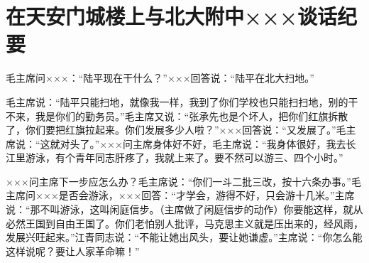 \section[在天安门城楼上与北大附中×××谈话纪要（一九六六年八月十八日）]{在天安门城楼上与北大附中×××谈话纪要}


毛主席问×××：“陆平现在干什么？”×××回答说：“陆平在北大扫地。”

毛主席说：“陆平只能扫地，就像我一样，我到了你们学校也只能扫扫地，别的干不来，我是你们的勤务员。”毛主席又说：“张承先也是个坏人，把你们红旗拆散了，你们要把红旗拉起来。你们发展多少人啦？”×××回答说：“又发展了。”毛主席说：“这就对头了。”×××问主席身体好不好，毛主席说：“我身体很好，我去长江里游泳，有个青年同志肝疼了，我就上来了。要不然可以游三、四个小时。”

×××问主席下一步应怎么办？毛主席说：“你们一斗二批三改，按十六条办事。”毛主席问×××是否会游泳，×××回答：“才学会，游得不好，只会游十几米。”主席说：“那不叫游泳，这叫闲庭信步。（主席做了闲庭信步的动作）你要能这样，就从必然王国到自由王国了。你们老怕别人批评，马克思主义就是压出来的，经风雨，发展兴旺起来。”江青同志说：“不能让她出风头，要让她谦虚。”主席说：“你怎么能这样说呢？要让人家革命嘛！”


